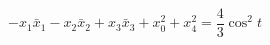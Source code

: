 \begin{equation}
-x_{1}\bar{x}_1-x_{2}\bar{x}_2+x_{3}\bar{x}_3+x_{0}^{2}+x_{4}^{2} = 
\frac{4}{3} \cos^2t
\end{equation}

